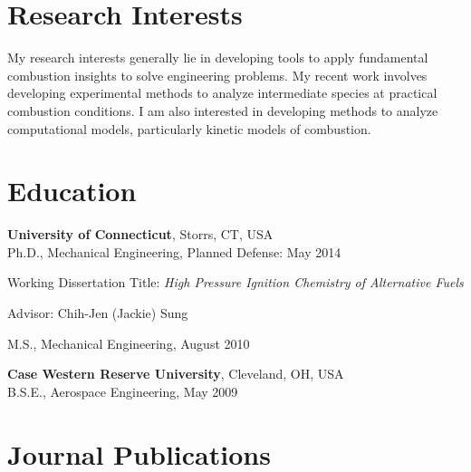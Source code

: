 \section{{\sectionfont Research Interests}}

My research interests generally lie in developing tools to apply fundamental
combustion insights to solve engineering problems. My recent work
involves developing experimental methods to analyze intermediate species
at practical combustion conditions. I am also interested in developing
methods to analyze computational models, particularly kinetic models of
combustion.

\section{{\sectionfont Education}}

\textbf{University of Connecticut}, Storrs, CT, USA\\
Ph.D., Mechanical Engineering, Planned Defense: May 2014
        \begin{innerlist}
        \item[] Working Dissertation Title: \textit{High Pressure
                Ignition Chemistry of Alternative Fuels}
        \item[] Advisor: Chih-Jen (Jackie) Sung
        \end{innerlist}

\vspace{0.1in}
M.S., Mechanical Engineering, August 2010

\vspace{0.2in}

\textbf{Case Western Reserve University}, Cleveland, OH, USA\\
B.S.E., Aerospace Engineering, May 2009

\section{{\sectionfont Journal Publications}}

